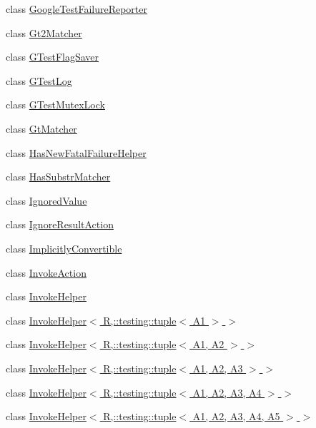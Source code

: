 \begin{DoxyCompactItemize}
class \hyperlink{classtesting_1_1internal_1_1GoogleTestFailureReporter}{Google\+Test\+Failure\+Reporter}
\item 
class \hyperlink{classtesting_1_1internal_1_1Gt2Matcher}{Gt2\+Matcher}
\item 
class \hyperlink{classtesting_1_1internal_1_1GTestFlagSaver}{G\+Test\+Flag\+Saver}
\item 
class \hyperlink{classtesting_1_1internal_1_1GTestLog}{G\+Test\+Log}
\item 
class \hyperlink{classtesting_1_1internal_1_1GTestMutexLock}{G\+Test\+Mutex\+Lock}
\item 
class \hyperlink{classtesting_1_1internal_1_1GtMatcher}{Gt\+Matcher}
\item 
class \hyperlink{classtesting_1_1internal_1_1HasNewFatalFailureHelper}{Has\+New\+Fatal\+Failure\+Helper}
\item 
class \hyperlink{classtesting_1_1internal_1_1HasSubstrMatcher}{Has\+Substr\+Matcher}
\item 
class \hyperlink{classtesting_1_1internal_1_1IgnoredValue}{Ignored\+Value}
\item 
class \hyperlink{classtesting_1_1internal_1_1IgnoreResultAction}{Ignore\+Result\+Action}
\item 
class \hyperlink{classtesting_1_1internal_1_1ImplicitlyConvertible}{Implicitly\+Convertible}
\item 
class \hyperlink{classtesting_1_1internal_1_1InvokeAction}{Invoke\+Action}
\item 
class \hyperlink{classtesting_1_1internal_1_1InvokeHelper}{Invoke\+Helper}
\item 
class \hyperlink{classtesting_1_1internal_1_1InvokeHelper_3_01R_00_1_1testing_1_1tuple_3_01A1_01_4_01_4}{Invoke\+Helper$<$ R,\+::testing\+::tuple$<$ A1 $>$ $>$}
\item 
class \hyperlink{classtesting_1_1internal_1_1InvokeHelper_3_01R_00_1_1testing_1_1tuple_3_01A1_00_01A2_01_4_01_4}{Invoke\+Helper$<$ R,\+::testing\+::tuple$<$ A1, A2 $>$ $>$}
\item 
class \hyperlink{classtesting_1_1internal_1_1InvokeHelper_3_01R_00_1_1testing_1_1tuple_3_01A1_00_01A2_00_01A3_01_4_01_4}{Invoke\+Helper$<$ R,\+::testing\+::tuple$<$ A1, A2, A3 $>$ $>$}
\item 
class \hyperlink{classtesting_1_1internal_1_1InvokeHelper_3_01R_00_1_1testing_1_1tuple_3_01A1_00_01A2_00_01A3_00_01A4_01_4_01_4}{Invoke\+Helper$<$ R,\+::testing\+::tuple$<$ A1, A2, A3, A4 $>$ $>$}
\item 
class \hyperlink{classtesting_1_1internal_1_1InvokeHelper_3_01R_00_1_1testing_1_1tuple_3_01A1_00_01A2_00_01A3_00_01A4_00_01A5_01_4_01_4}{Invoke\+Helper$<$ R,\+::testing\+::tuple$<$ A1, A2, A3, A4, A5 $>$ $>$}

\end{DoxyCompactItemize}
